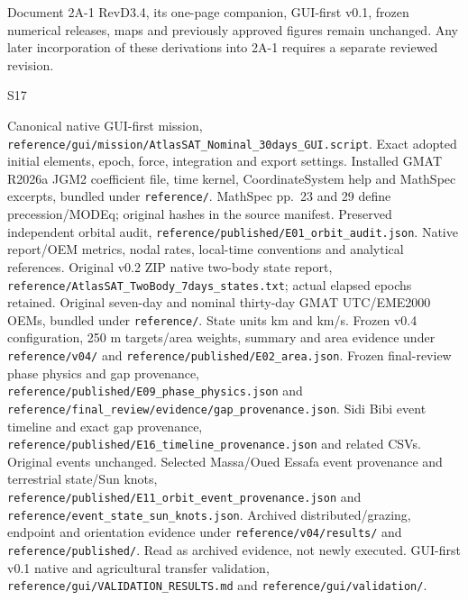 \documentclass[10pt,a4paper]{article}
\numberwithin{equation}{section}
\begin{document}
\begin{sloppypar}Document 2A-1 RevD3.4, its one-page companion, GUI-first v0.1, frozen numerical releases, maps and previously approved figures remain unchanged. Any later incorporation of these derivations into 2A-1 requires a separate reviewed revision.\end{sloppypar}

\clearpage
\begingroup\small
\begin{thebibliography}{S17}
 Canonical native GUI-first mission, \nolinkurl{reference/gui/mission/AtlasSAT_Nominal_30days_GUI.script}. Exact adopted initial elements, epoch, force, integration and export settings.
 Installed GMAT R2026a JGM2 coefficient file, time kernel, CoordinateSystem help and MathSpec excerpts, bundled under \nolinkurl{reference/}. MathSpec pp.~23 and 29 define precession/MODEq; original hashes in the source manifest.
 Preserved independent orbital audit, \nolinkurl{reference/published/E01_orbit_audit.json}. Native report/OEM metrics, nodal rates, local-time conventions and analytical references.
 Original v0.2 ZIP native two-body state report, \nolinkurl{reference/AtlasSAT_TwoBody_7days_states.txt}; actual elapsed epochs retained.
 Original seven-day and nominal thirty-day GMAT UTC/EME2000 OEMs, bundled under \nolinkurl{reference/}. State units km and km/s.
 Frozen v0.4 configuration, 250 m targets/area weights, summary and area evidence under \nolinkurl{reference/v04/} and \nolinkurl{reference/published/E02_area.json}.
 Frozen final-review phase physics and gap provenance, \nolinkurl{reference/published/E09_phase_physics.json} and \nolinkurl{reference/final_review/evidence/gap_provenance.json}.
 Sidi Bibi event timeline and exact gap provenance, \nolinkurl{reference/published/E16_timeline_provenance.json} and related CSVs. Original events unchanged.
 Selected Massa/Oued Essafa event provenance and terrestrial state/Sun knots, \nolinkurl{reference/published/E11_orbit_event_provenance.json} and \nolinkurl{reference/event_state_sun_knots.json}.
 Archived distributed/grazing, endpoint and orientation evidence under \nolinkurl{reference/v04/results/} and \nolinkurl{reference/published/}. Read as archived evidence, not newly executed.
 GUI-first v0.1 native and agricultural transfer validation, \nolinkurl{reference/gui/VALIDATION_RESULTS.md} and \nolinkurl{reference/gui/validation/}.

\end{thebibliography}
\end{document}
